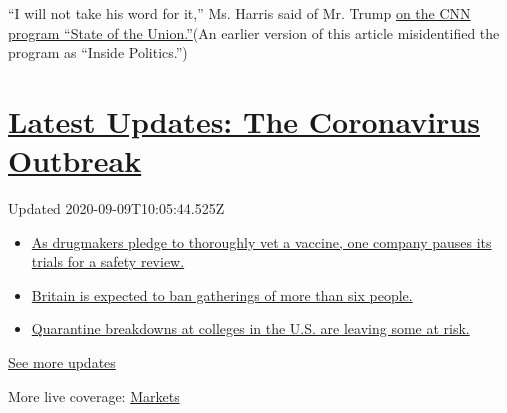 ``I will not take his word for it,'' Ms. Harris said of Mr. Trump
\href{https://www.cnn.com/2020/09/05/politics/kamala-harris-not-trust-trump-vaccine-cnntv/index.html}{on
the CNN program ``State of the Union.''}(An earlier version of this
article misidentified the program as ``Inside Politics.'')

\hypertarget{latest-updates-the-coronavirus-outbreak}{%
\section{\texorpdfstring{\href{https://www.nytimes3xbfgragh.onion/2020/09/09/world/covid-19-coronavirus.html?action=click\&pgtype=Article\&state=default\&region=MAIN_CONTENT_1\&context=storylines_live_updates}{Latest
Updates: The Coronavirus
Outbreak}}{Latest Updates: The Coronavirus Outbreak}}\label{latest-updates-the-coronavirus-outbreak}}

Updated 2020-09-09T10:05:44.525Z

\begin{itemize}
\tightlist
\item
  \href{https://www.nytimes3xbfgragh.onion/2020/09/09/world/covid-19-coronavirus.html?action=click\&pgtype=Article\&state=default\&region=MAIN_CONTENT_1\&context=storylines_live_updates\#link-70cea8bb}{As
  drugmakers pledge to thoroughly vet a vaccine, one company pauses its
  trials for a safety review.}
\item
  \href{https://www.nytimes3xbfgragh.onion/2020/09/09/world/covid-19-coronavirus.html?action=click\&pgtype=Article\&state=default\&region=MAIN_CONTENT_1\&context=storylines_live_updates\#link-780eaa2f}{Britain
  is expected to ban gatherings of more than six people.}
\item
  \href{https://www.nytimes3xbfgragh.onion/2020/09/09/world/covid-19-coronavirus.html?action=click\&pgtype=Article\&state=default\&region=MAIN_CONTENT_1\&context=storylines_live_updates\#link-11cec4c0}{Quarantine
  breakdowns at colleges in the U.S. are leaving some at risk.}
\end{itemize}

\href{https://www.nytimes3xbfgragh.onion/2020/09/09/world/covid-19-coronavirus.html?action=click\&pgtype=Article\&state=default\&region=MAIN_CONTENT_1\&context=storylines_live_updates}{See
more updates}

More live coverage:
\href{https://www.nytimes3xbfgragh.onion/live/2020/09/08/business/stock-market-today-coronavirus?action=click\&pgtype=Article\&state=default\&region=MAIN_CONTENT_1\&context=storylines_live_updates}{Markets}

